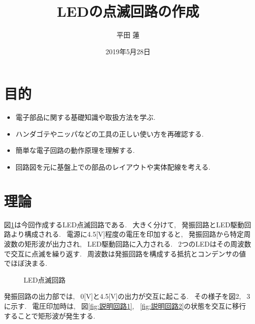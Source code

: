\documentclass[titlepage, uplatex]{jsarticle}
\title{LEDの点滅回路の作成}
\author{平田 蓮}
\date{2019年5月28日}
\begin{document}
\maketitle
\section{目的}
	\begin{itemize}
		\item 電子部品に関する基礎知識や取扱方法を学ぶ.
		\item ハンダゴテやニッパなどの工具の正しい使い方を再確認する.
		\item 簡単な電子回路の動作原理を理解する.
		\item 回路図を元に基盤上での部品のレイアウトや実体配線を考える.
	\end{itemize}

\section{理論}
	図\ref{fig:LED点滅回路}は今回作成するLED点滅回路である. ~大きく分けて, ~発振回路とLED駆動回路より構成される.
	~電源に4.5[V]程度の電圧を印加すると, ~発振回路から特定周波数の矩形波が出力され, ~LED駆動回路に入力される.
	~2つのLEDはその周波数で交互に点滅を繰り返す. ~周波数は発振回路を構成する抵抗とコンデンサの値でほぼ決まる.

	\begin{figure}[h]
		\caption{LED点滅回路}
		\label{fig:LED点滅回路}
	\end{figure}

	発振回路の出力部では, ~0[V]と4.5[V]の出力が交互に起こる. ~その様子を図2, ~3に示す.
	~電圧印加時は, ~図\ref{fig:説明回路1}, ~\ref{fig:説明回路2}の状態を交互に移行することで矩形波が発生する.
\end{document}
